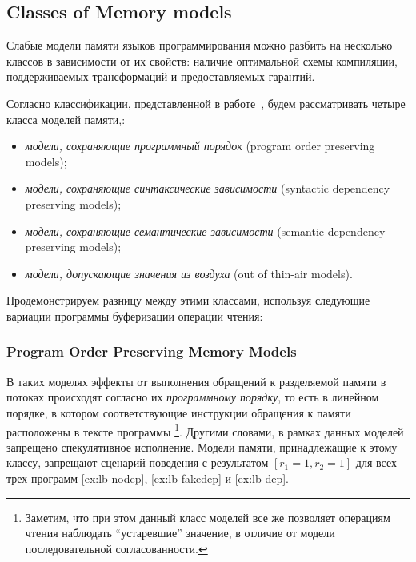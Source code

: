 \subsection{Classes of Memory models}
\label{sec:models-classes}

Слабые модели памяти языков программирования 
можно разбить на несколько классов в зависимости от их свойств: наличие 
 оптимальной схемы компиляции, 
поддерживаемых трансформаций и предоставляемых гарантий. 

Согласно классификации, представленной в работе~\cite{Moiseenko-al:PCS21}, будем рассматривать четыре класса моделей памяти,: 
\begin{itemize}
  \item \emph{модели, сохраняющие программный порядок}
        (program order preserving models); 
  \item \emph{модели, сохраняющие синтаксические зависимости} 
        (syntactic dependency preserving models);
  \item \emph{модели, сохраняющие семантические зависимости} 
        (semantic dependency preserving models);
  \item \emph{модели, допускающие значения из воздуха} (out of thin-air models).
\end{itemize}

 

Продемонстрируем разницу между этими классами, 
 используя  следующие вариации программы 
буферизации операции чтения: 



\subsubsection*{Program Order Preserving Memory Models}

В таких  моделях 
эффекты от выполнения обращений к разделяемой памяти в потоках 
происходят согласно их \emph{программному порядку},
то есть в линейном порядке, в котором соответствующие 
инструкции обращения к памяти расположены в тексте программы%
\footnote{Заметим, что при этом данный класс моделей 
все же позволяет операциям чтения наблюдать ``устаревшие'' значение, 
в отличие от модели последовательной согласованности.}. 
Другими словами, в рамках данных моделей запрещено 
спекулятивное исполнение. 
Модели памяти, принадлежащие к этому классу, 
запрещают сценарий поведения с результатом ${[r_1=1,r_2=1]}$
для всех трех программ \ref{ex:lb-nodep}, \ref{ex:lb-fakedep} и \ref{ex:lb-dep}.

